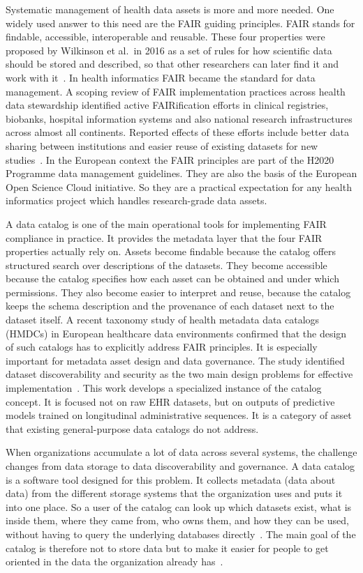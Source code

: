 Systematic management of health data assets is more and more needed. One widely used answer to this need are the FAIR guiding principles. FAIR stands for findable, accessible, interoperable and reusable. These four properties were proposed by Wilkinson et al.\ in 2016 as a set of rules for how scientific data should be stored and described, so that other researchers can later find it and work with it~\cite{wilkinson2016fair}. In health informatics FAIR became the standard for data management. A scoping review of FAIR implementation practices across health data stewardship identified active FAIRification efforts in clinical registries, biobanks, hospital information systems and also national research infrastructures across almost all continents. Reported effects of these efforts include better data sharing between institutions and easier reuse of existing datasets for new studies~\cite{zeleke2022fair}. In the European context the FAIR principles are part of the H2020 Programme data management guidelines. They are also the basis of the European Open Science Cloud initiative. So they are a practical expectation for any health informatics project which handles research-grade data assets.

A data catalog is one of the main operational tools for implementing FAIR compliance in practice. It provides the metadata layer that the four FAIR properties actually rely on. Assets become findable because the catalog offers structured search over descriptions of the datasets. They become accessible because the catalog specifies how each asset can be obtained and under which permissions. They also become easier to interpret and reuse, because the catalog keeps the schema description and the provenance of each dataset next to the dataset itself. A recent taxonomy study of health metadata data catalogs (HMDCs) in European healthcare data environments confirmed that the design of such catalogs has to explicitly address FAIR principles. It is especially important for metadata asset design and data governance. The study identified dataset discoverability and security as the two main design problems for effective implementation~\cite{mallick2025hmdc}. This work develops a specialized instance of the catalog concept. It is focused not on raw EHR datasets, but on outputs of predictive models trained on longitudinal administrative sequences. It is a category of asset that existing general-purpose data catalogs do not address.

When organizations accumulate a lot of data across several systems, the challenge changes from data storage to data discoverability and governance. A data catalog is a software tool designed for this problem. It collects metadata (data about data) from the different storage systems that the organization uses and puts it into one place. So a user of the catalog can look up which datasets exist, what is inside them, where they came from, who owns them, and how they can be used, without having to query the underlying databases directly~\cite{data_world_catalog_2025}. The main goal of the catalog is therefore not to store data but to make it easier for people to get oriented in the data the organization already has~\cite{atlan_catalog_2025}.

